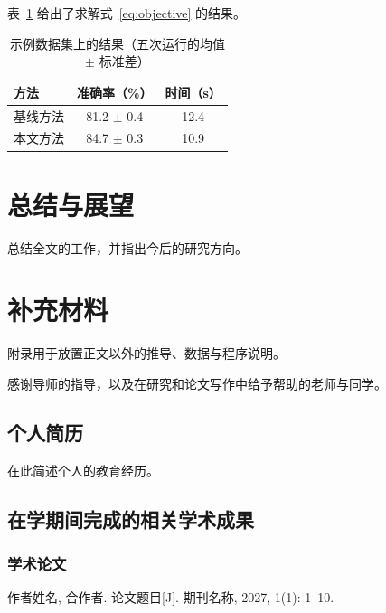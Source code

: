 \documentclass[degree=master,fontset=fandol]{thuthesis}
\begin{document}
表~\ref{tab:results} 给出了求解式~\eqref{eq:objective} 的结果。

\begin{table}[!htb]
  \centering
  \caption{示例数据集上的结果（五次运行的均值 $\pm$ 标准差）}
  \label{tab:results}
  \begin{tabular}{lcc}
    \toprule
    方法     & 准确率（\%）     & 时间（s） \\
    \midrule
    基线方法 & 81.2 $\pm$ 0.4 & 12.4      \\
    本文方法 & 84.7 $\pm$ 0.3 & 10.9      \\
    \bottomrule
  \end{tabular}
\end{table}

\chapter{总结与展望}
总结全文的工作，并指出今后的研究方向。



\appendix

\chapter{补充材料}
附录用于放置正文以外的推导、数据与程序说明。

\backmatter

\begin{acknowledgements}
  感谢导师的指导，以及在研究和论文写作中给予帮助的老师与同学。
\end{acknowledgements}

\statement

\begin{resume}
  \section*{个人简历}
  在此简述个人的教育经历。

  \section*{在学期间完成的相关学术成果}
  \subsection*{学术论文}
  \begin{achievements}
    \item 作者姓名, 合作者. 论文题目[J]. 期刊名称, 2027, 1(1): 1--10.
  \end{achievements}
\end{resume}
\end{document}
